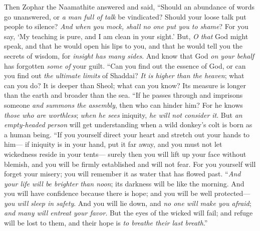 \begin{biblechapter} %
 Then Zophar the Naamathite answered and said,
\verse “Should an abundance of words go unanswered, 
or \textit{a man full of talk} be vindicated?
\verse Should your loose talk put people to silence? 
\textit{And when you mock, shall no one put you to shame}?
\verse For you say, ‘My teaching is pure, 
and I am clean in your sight.’
\verse But, \textit{O that} God might speak, 
and that he would open his lips to you,
\verse and that he would tell you the secrets of wisdom, 
for \textit{insight has many sides}. 
And know that God \textit{on your behalf} has forgotten \textit{some of} your guilt.
\verse “Can you find out the essence of God, 
or can you find out \textit{the ultimate limits} of Shaddai?
\verse \textit{It is higher than the heaven}; what can you do? 
It is deeper than Sheol; what can you know?
\verse Its measure is longer than the earth 
and broader than the sea.
\verse “If he passes through and imprisons someone 
\textit{and summons the assembly}, then who can hinder him?
\verse For he knows \textit{those who are worthless}; 
\textit{when he sees} iniquity, \textit{he will not consider it}.
\verse But \textit{an empty-headed person} will get understanding 
when a wild donkey’s colt is born as a human being.
\verse “If you yourself direct your heart 
and stretch out your hands to him—
\verse if iniquity is in your hand, put it far away, 
and you must not let wickedness reside in your tents—
\verse surely then you will lift up your face without blemish, 
and you will be firmly established and will not fear.
\verse For you yourself will forget your misery; 
you will remember it as water that has flowed past.
\verse “\textit{And your life will be brighter than noon}; 
its darkness will be like the morning.
\verse And you will have confidence because there is hope; 
and you will be well protected—\textit{you will sleep in safety}.
\verse And you will lie down, and \textit{no one will make you afraid}; 
\textit{and many will entreat your favor}.
\verse But the eyes of the wicked will fail; 
and refuge will be lost to them, 
and their hope is \textit{to breathe their last breath}.”
\end{biblechapter}


